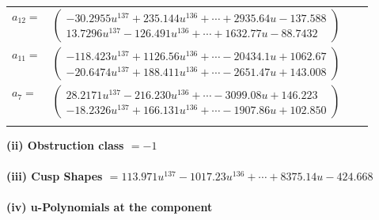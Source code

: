 \documentclass[1p]{elsarticle_modified}
\theoremstyle{definition}
\begin{document}
\begin{tabular}{m{7pt} m{180pt} m{7pt} m{180pt} }
\flushright $a_{12}=$&$\begin{pmatrix}-30.2955 u^{137}+235.144 u^{136}+\cdots+2935.64 u-137.588\\13.7296 u^{137}-126.491 u^{136}+\cdots+1632.77 u-88.7432\end{pmatrix}$ \\
\flushright $a_{11}=$&$\begin{pmatrix}-118.423 u^{137}+1126.56 u^{136}+\cdots-20434.1 u+1062.67\\-20.6474 u^{137}+188.411 u^{136}+\cdots-2651.47 u+143.008\end{pmatrix}$ \\
\flushright $a_{7}=$&$\begin{pmatrix}28.2171 u^{137}-216.230 u^{136}+\cdots-3099.08 u+146.223\\-18.2326 u^{137}+166.131 u^{136}+\cdots-1907.86 u+102.850\end{pmatrix}$\\&\end{tabular}
\flushleft \textbf{(ii) Obstruction class $= -1$}\\~\\
\flushleft \textbf{(iii) Cusp Shapes $= 113.971 u^{137}-1017.23 u^{136}+\cdots+8375.14 u-424.668$}\\~\\
\newpage\renewcommand{\arraystretch}{1}
\flushleft \textbf{(iv) u-Polynomials at the component}\newline \\
\end{document}
